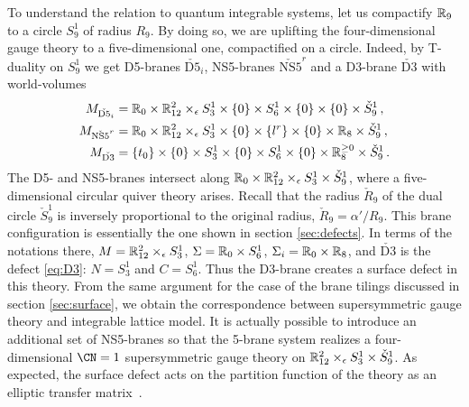 To understand the relation to quantum integrable systems, let us
compactify $\mathbb{R}_9$ to a circle $S^1_9$ of radius $R_9$.  By doing so,
we are uplifting the four-dimensional gauge theory to a
five-dimensional one, compactified on a circle.  Indeed, by T-duality
on $S^1_9$ we get D5-branes $\check{\mathrm{D5}}_i$, NS5-branes
$\check{\mathrm{NS5}}^r$ and a D3-brane $\check{\mathrm{D3}}$ with
world-volumes
\begin{align}
  \label{eq:M-D5}
  M_{\check{\mathrm{D5}}_i}
  &=
  \mathbb{R}_0 \times \mathbb{R}^2_{12} \times_\epsilon S^1_3 \times \{0\}
  \times S^1_6 \times \{0\} \times \{0\} \times \check S^1_9 \,,
  \\
  \label{eq:M-NS5}
  M_{\check{\mathrm{NS5}}^r}
  &=
  \mathbb{R}_0 \times \mathbb{R}^2_{12} \times_\epsilon S^1_3 \times \{0\}
  \times \{l^r\} \times \{0\} \times \mathbb{R}_8 \times \check S^1_9 \,,
  \\
  \label{eq:M-D3}
  M_{\check{\mathrm{D3}}}
  &=
  \{t_0\} \times \{0\} \times S^1_3 \times \{0\}
  \times S^1_6 \times \{0\} \times \mathbb{R}^{\geq0}_8
  \times \check S^1_9 \,.
\end{align}
The D5- and NS5-branes intersect along
$\mathbb{R}_0 \times \mathbb{R}^2_{12} \times_\epsilon S^1_3 \times \check S^1_9$, where a
five-dimensional circular quiver theory arises.  Recall that the
radius $\check{R}_9$ of the dual circle $\check{S}^1_9$ is inversely
proportional to the original radius, $\check{R}_9 = \alpha'/R_9$.
This brane configuration is essentially the one shown in section \ref{sec:defects}.
In terms of the notations there, $M=\mathbb{R}^2_{12}\times_{\epsilon}S^1_3$, $\Sigma=\mathbb{R}_0\times S^1_6$,
$\Sigma_i =\mathbb{R}_0\times\mathbb{R}_8$,
and $\check{\mathrm{D3}}$ is the defect \eqref{eq:D3}: $N=S^1_3$ and $C=S^1_6$.
Thus the D3-brane creates a surface defect in this theory.
From the same argument for the case of the brane tilings discussed in section \ref{sec:surface},
we obtain the correspondence between supersymmetric gauge theory
and integrable lattice model.
It is actually possible to
introduce an additional set of NS5-branes so that the 5-brane system
realizes a four-dimensional $\CN = 1$ supersymmetric gauge theory on
$\mathbb{R}^2_{12} \times_\epsilon S^1_3 \times \check S^1_9$.
As expected, the surface defect acts on the
partition function of the theory as an elliptic transfer
matrix~\cite{Maruyoshi:2016caf,Yagi:2017hmj}.








